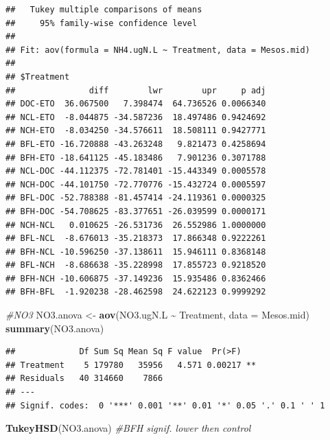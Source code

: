 \documentclass[
]{article}
\newenvironment{Shaded}{\begin{snugshade}}{\end{snugshade}}
\newcommand{\AttributeTok}[1]{\textcolor[rgb]{0.13,0.29,0.53}{#1}}
\newcommand{\CommentTok}[1]{\textcolor[rgb]{0.56,0.35,0.01}{\textit{#1}}}
\newcommand{\FunctionTok}[1]{\textcolor[rgb]{0.13,0.29,0.53}{\textbf{#1}}}
\newcommand{\NormalTok}[1]{#1}
\newcommand{\OtherTok}[1]{\textcolor[rgb]{0.56,0.35,0.01}{#1}}
\newcommand{\SpecialCharTok}[1]{\textcolor[rgb]{0.81,0.36,0.00}{\textbf{#1}}}
\begin{document}
\begin{verbatim}
##   Tukey multiple comparisons of means
##     95% family-wise confidence level
## 
## Fit: aov(formula = NH4.ugN.L ~ Treatment, data = Mesos.mid)
## 
## $Treatment
##               diff        lwr        upr     p adj
## DOC-ETO  36.067500   7.398474  64.736526 0.0066340
## NCL-ETO  -8.044875 -34.587236  18.497486 0.9424692
## NCH-ETO  -8.034250 -34.576611  18.508111 0.9427771
## BFL-ETO -16.720888 -43.263248   9.821473 0.4258694
## BFH-ETO -18.641125 -45.183486   7.901236 0.3071788
## NCL-DOC -44.112375 -72.781401 -15.443349 0.0005578
## NCH-DOC -44.101750 -72.770776 -15.432724 0.0005597
## BFL-DOC -52.788388 -81.457414 -24.119361 0.0000325
## BFH-DOC -54.708625 -83.377651 -26.039599 0.0000171
## NCH-NCL   0.010625 -26.531736  26.552986 1.0000000
## BFL-NCL  -8.676013 -35.218373  17.866348 0.9222261
## BFH-NCL -10.596250 -37.138611  15.946111 0.8368148
## BFL-NCH  -8.686638 -35.228998  17.855723 0.9218520
## BFH-NCH -10.606875 -37.149236  15.935486 0.8362466
## BFH-BFL  -1.920238 -28.462598  24.622123 0.9999292
\end{verbatim}

\begin{Shaded}
\begin{Highlighting}[]
\CommentTok{\#NO3}
\NormalTok{NO3.anova }\OtherTok{\textless{}{-}} \FunctionTok{aov}\NormalTok{(NO3.ugN.L }\SpecialCharTok{\textasciitilde{}}\NormalTok{ Treatment, }\AttributeTok{data =}\NormalTok{ Mesos.mid)}
\FunctionTok{summary}\NormalTok{(NO3.anova)}
\end{Highlighting}
\end{Shaded}

\begin{verbatim}
##             Df Sum Sq Mean Sq F value  Pr(>F)   
## Treatment    5 179780   35956   4.571 0.00217 **
## Residuals   40 314660    7866                   
## ---
## Signif. codes:  0 '***' 0.001 '**' 0.01 '*' 0.05 '.' 0.1 ' ' 1
\end{verbatim}

\begin{Shaded}
\begin{Highlighting}[]
\FunctionTok{TukeyHSD}\NormalTok{(NO3.anova) }\CommentTok{\#BFH signif. lower then control}
\end{Highlighting}
\end{Shaded}
\end{document}

